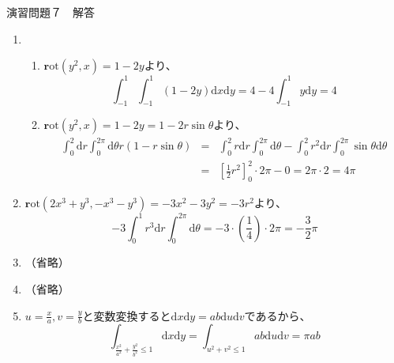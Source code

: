 \documentclass{jarticle}
\def\d{\mathrm d}
\def\rot{\mathrm{\bm rot}}
\begin{document}
\begin{center} {\Large 演習問題７　解答} \end{center}
  \begin{enumerate}
    \item
      \begin{enumerate}
        \item
          $\rot (y^2,x) = 1-2y$より、
          \[ \int_{-1}^{1} \int_{-1}^{1} (1-2y) \d x \d y =  4 - 4 \int_{-1}^{1} y \d y = 4 \]
        \item
          $\rot (y^2,x) = 1-2y = 1 - 2 r \sin \theta$より、
          \begin{eqnarray*}
            \int_0^2 \d r \int_0^{2\pi} \d \theta r ( 1 - r \sin \theta ) & = & \int_0^2 r \d r \int_0^{2\pi} \d \theta - \int_0^2 r^2 \d r \int_0^{2\pi} \sin \theta \d \theta \\
            & = & \left[ \frac{1}{2} r^2 \right]_0^2 \cdot 2 \pi - 0 = 2\pi \cdot 2 = 4\pi
          \end{eqnarray*}
      \end{enumerate}
    \item
      $\rot ( 2x^3+y^3, -x^3-y^3) = -3x^2 - 3y^2 = -3r^2$より、
      \[ -3 \int_0^1 r^3 \d r \int_0^{2\pi} \d \theta = -3 \cdot ( \frac{1}{4} ) \cdot 2\pi = - \frac{3}{2} \pi \]
    \item
      （省略）
    \item
      （省略）
    \item
      $u = \frac{x}{a}, v = \frac{y}{b}$と変数変換すると$\d x \d y = a b \d u \d v$であるから、
      \[ \int_{\frac{x^2}{a^2}+\frac{y^2}{b^2} \leq 1 } \d x \d y = \int_{u^2+v^2 \leq 1} ab \d u \d v = \pi ab \]
  \end{enumerate}
\end{document}
